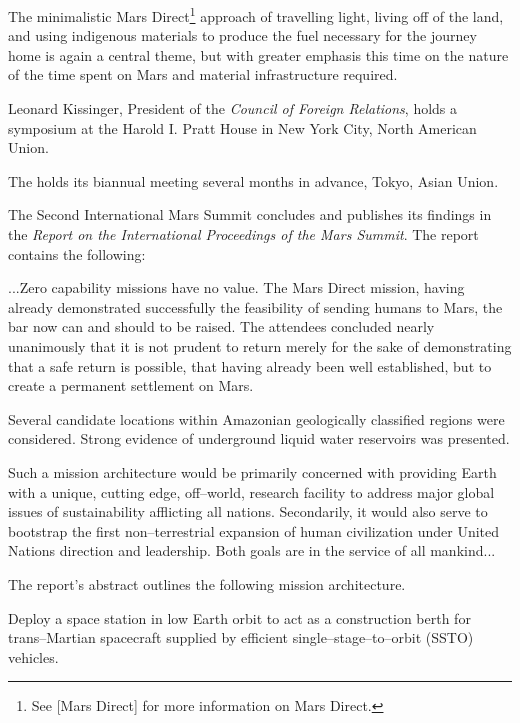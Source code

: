 The minimalistic Mars Direct\footnote{See [Mars Direct] for more information on Mars Direct.} approach of travelling light, living off of the land, and using indigenous materials to produce the fuel necessary for the journey home is again a central theme, but with greater emphasis this time on the nature of the time spent on Mars and material infrastructure required.
\StopTimelineDate

Leonard Kissinger, President of the {\it Council of Foreign Relations}, holds a symposium at the Harold I. Pratt House in New York City, North American Union.
\StopTimelineDate

The  holds its biannual meeting several months in advance, Tokyo, Asian Union.
\StopTimelineDate

The Second International Mars Summit concludes and publishes its findings in the {\it Report on the International Proceedings of the Mars Summit}. The report contains the following:

\startTimelineGeneralDocument
...Zero capability missions have no value. The Mars Direct mission, having already demonstrated successfully the feasibility of sending humans to Mars, the bar now can and should to be raised. The attendees concluded nearly unanimously that it is not prudent to return merely for the sake of demonstrating that a safe return is possible, that having already been well established, but to create a permanent settlement on Mars. 

Several candidate locations within Amazonian geologically classified regions were considered. Strong evidence of underground liquid water reservoirs was presented.

Such a mission architecture would be primarily concerned with providing Earth with a unique, cutting edge, off--world, research facility to address major global issues of sustainability afflicting all nations. Secondarily, it would also serve to bootstrap the first non--terrestrial expansion of human civilization under United Nations direction and leadership. Both goals are in the service of all mankind...
\stopTimelineGeneralDocument

The report's abstract outlines the following mission architecture.

\startitemize[R]
\item Deploy a space station in low Earth orbit to act as a construction berth for trans--Martian spacecraft supplied by efficient single--stage--to--orbit (SSTO) vehicles.

